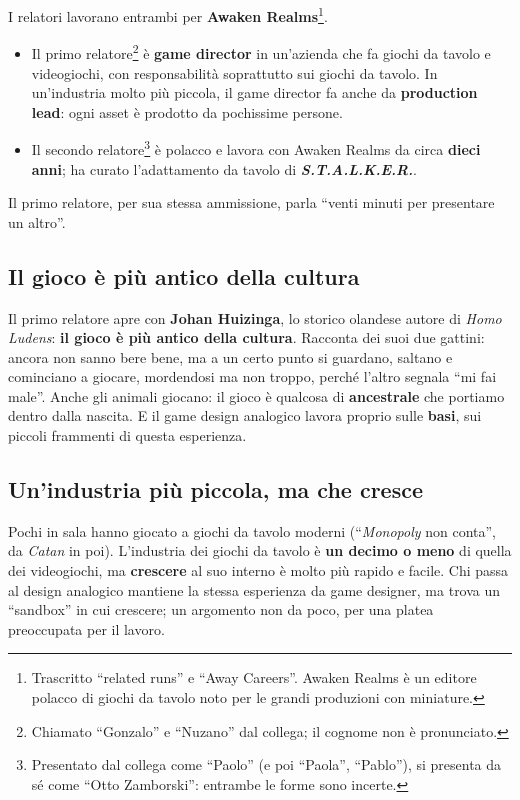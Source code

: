 I relatori lavorano entrambi per \textbf{Awaken Realms}\footnote{Trascritto
``related runs'' e ``Away Careers''. Awaken Realms è un editore polacco di giochi
da tavolo noto per le grandi produzioni con miniature.}.
\begin{itemize}
  \item Il primo relatore\footnote{Chiamato ``Gonzalo'' e ``Nuzano'' dal collega;
        il cognome non è pronunciato.} è \textbf{game director} in un'azienda che fa
        giochi da tavolo e videogiochi, con responsabilità soprattutto sui giochi da
        tavolo. In un'industria molto più piccola, il game director fa anche da
        \textbf{production lead}: ogni asset è prodotto da pochissime persone.
  \item Il secondo relatore\footnote{Presentato dal collega come ``Paolo'' (e poi
        ``Paola'', ``Pablo''), si presenta da sé come ``Otto Zamborski'': entrambe
        le forme sono incerte.} è polacco e lavora con Awaken Realms da circa
        \textbf{dieci anni}; ha curato l'adattamento da tavolo di
        \textbf{\emph{S.T.A.L.K.E.R.}}.
\end{itemize}
Il primo relatore, per sua stessa ammissione, parla ``venti minuti per presentare
un altro''.

\subsection{Il gioco è più antico della cultura}

Il primo relatore apre con \textbf{Johan Huizinga}, lo storico olandese autore di
\emph{Homo Ludens}: \textbf{il gioco è più antico della cultura}. Racconta dei suoi
due gattini: ancora non sanno bere bene, ma a un certo punto si guardano, saltano e
cominciano a giocare, mordendosi ma non troppo, perché l'altro segnala ``mi fai
male''. Anche gli animali giocano: il gioco è qualcosa di \textbf{ancestrale} che
portiamo dentro dalla nascita. E il game design analogico lavora proprio sulle
\textbf{basi}, sui piccoli frammenti di questa esperienza.

\subsection{Un'industria più piccola, ma che cresce}

Pochi in sala hanno giocato a giochi da tavolo moderni (``\emph{Monopoly} non
conta'', da \emph{Catan} in poi). L'industria dei giochi da tavolo è
\textbf{un decimo o meno} di quella dei videogiochi, ma \textbf{crescere} al suo
interno è molto più rapido e facile. Chi passa al design analogico mantiene la
stessa esperienza da game designer, ma trova un ``sandbox'' in cui crescere; un
argomento non da poco, per una platea preoccupata per il lavoro.

